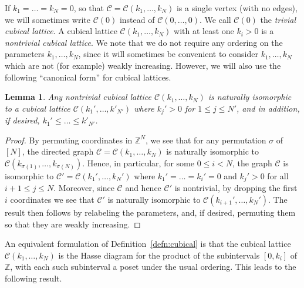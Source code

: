 \documentclass[11pt]{amsart}
\theoremstyle{plain}
\newtheorem{lemma}[thm]{Lemma}
\theoremstyle{definition}
\newcommand{\cC}{\mathcal{C}}
\newcommand{\Z}{\mathbb{Z}}
\numberwithin{equation}{subsection}
\begin{document}
If $k_1 = \dots = k_N = 0$, so that $\cC = \cC(k_1,\dots,k_N)$ is a single vertex (with no edges), we will sometimes write $\cC(0)$ instead of $\cC(0,\dots,0)$. We call $\cC(0)$ the \emph{trivial cubical lattice}. A cubical lattice $\cC(k_1,\dots,k_N)$ with at least one $k_i > 0$ is a \emph{nontrivial cubical lattice}. We note that we do not require any ordering on the parameters $k_1,\dots,k_N$, since it will sometimes be convenient to consider $k_1, \dots, k_N$ which are not (for example) weakly increasing. However, we will also use the following ``canonical form'' for cubical lattices.

\begin{lemma}\label{lem:permute} Any nontrivial cubical lattice $\cC(k_1,\dots,k_N)$ is naturally isomorphic to a cubical lattice $\cC(k_1',\dots,k'_{N'})$ where $k_j' > 0$ for $1 \leq j \leq N'$, and in addition, if desired, $k_1' \leq \dots \leq k'_{N'}$.
\end{lemma}
\begin{proof}
By permuting coordinates in $\Z^N$, we see that for any permutation $\sigma$ of $[N]$, the directed graph $\cC = \cC(k_1,\dots,k_N)$ is naturally isomorphic to $\cC(k_{\sigma(1)},\dots,k_{\sigma(N)})$. Hence, in particular, for some $0 \leq i < N$, the graph $\cC$ is isomorphic to $\cC' = \cC(k_1', \dots, k_N')$ where $k_1' = \dots = k_{i}' = 0$ and $k_j' > 0$ for all $i+1 \leq j \leq N$. Moreover, since $\cC$ and hence $\cC'$ is nontrivial, by dropping the first $i$ coordinates we see that $\cC'$ is naturally isomorphic to $\cC(k_{i+1}',\dots,k_N')$. The result then follows by relabeling the parameters, and, if desired, permuting them so that they are weakly increasing.
\end{proof}



An equivalent formulation of Definition~\ref{defn:cubical} is that the cubical lattice $\cC(k_1, \dots, k_N)$ is the Hasse diagram for the product of the subintervals $[0,k_i]$ of $\Z$, with each such subinterval a poset under the usual ordering. This  leads to the following result.
\end{document}
